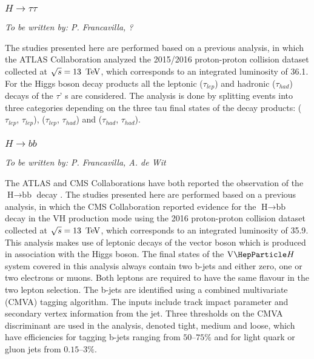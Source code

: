 


\subsubsection{$H \to \tau\tau$}
\begin{center}
  \textit{To be written by: P. Francavilla, ?}
\end{center}

The studies presented here are performed based on a previous analysis, in which the ATLAS Collaboration analyzed the 2015/2016 proton-proton collision dataset collected at $\sqrt{s} = 13\,~\text{TeV}$, which corresponds to an integrated luminosity of 36.1\fbinv \cite{}. 
For the Higgs boson decay products all the leptonic ($\tau_{lep}$) and hadronic ($\tau_{had}$) decays of the $\tau$' s are considered. The analysis is done by splitting events into three categories depending on the three tau final states of the decay products: ($\tau_{lep}$, $\tau_{lep}$), ($\tau_{lep}$, $\tau_{had}$) and ($\tau_{had}$, $\tau_{had}$).



\subsubsection{$H \to bb$}
{\it To be written by: P. Francavilla, A. de Wit}


The ATLAS and CMS Collaborations have both reported the observation of the $\text{H}\to\text{bb}$ decay \cite{Aaboud:2018zhk,Sirunyan:2018kst}.
The studies presented here are performed based on a previous analysis, in which 
the CMS Collaboration reported evidence for the $\text{H}\to\text{bb}$ decay in the $\text{VH}$ production mode using the 2016
proton-proton collision dataset collected at $\sqrt{s} = 13\,~\text{TeV}$, which corresponds to an integrated luminosity of 35.9\fbinv \cite{HIG16044}. 
This analysis makes use of leptonic decays of the vector boson which is produced in association with the Higgs boson. The final states
of the $\vh$ system covered in this analysis always contain two b-jets and either zero, one or two electrons or muons. Both leptons are required to have the same flavour in the two lepton selection.
The b-jets are identified using a combined multivariate (CMVA) tagging algorithm. The inputs include track impact parameter and secondary vertex information from the jet. Three thresholds on the CMVA discriminant are used in the analysis, denoted tight, medium and loose, which have efficiencies for tagging b-jets ranging from $50$--$75\%$ and for light quark or gluon jets from $0.15$--$3\%$.

